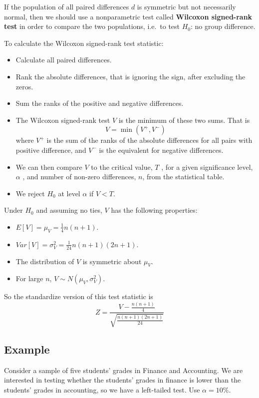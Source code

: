 \documentclass[
]{article}
\begin{document}
If the population of all paired differences \(d\) is symmetric but not
necessarily normal, then we should use a nonparametric test called
\textbf{Wilcoxon signed-rank test} in order to compare the two
populations, i.e.~to test \(H_0\): no group difference.

To calculate the Wilcoxon signed-rank test statistic:

\begin{itemize}
\item
  Calculate all paired differences.
\item
  Rank the absolute differences, that is ignoring the sign, after
  excluding the zeros.
\item
  Sum the ranks of the positive and negative differences.
\item
  The Wilcoxon signed-rank test \(V\) is the minimum of these two sums.
  That is \[V=\min(V^+,V^-)\] where \(V^+\) is the sum of the ranks of
  the absolute differences for all pairs with positive difference, and
  \(V^-\) is the equivalent for negative differences.
\item
  We can then compare \(V\) to the critical value, \(T\) , for a given
  significance level, \(\alpha\) , and number of non-zero differences,
  \(n\), from the statistical table.
\item
  We reject \(H_0\) at level \(\alpha\) if \(V<T\).
\end{itemize}

Under \(H_0\) and assuming no ties, \(V\) has the following properties:

\begin{itemize}
\item
  \(E[V] = \mu_{V} = \frac{1}{4}n(n+1)\).
\item
  \(Var[V] = \sigma^2_{V} = \frac{1}{24} n(n+1)(2n+1)\).
\item
  The distribution of \(V\) is symmetric about \(\mu_{V}\).
\item
  For large \(n\), \(V \sim N(\mu_{V}, \sigma^2_{V})\).
\end{itemize}

So the standardize version of this test statistic is
\[Z=\frac{V-\frac{n(n+1)}{4}}{\sqrt{\frac{n(n+1)(2n+1)}{24}}}\]

\hypertarget{example-5}{%
\subsection{Example}\label{example-5}}

Consider a sample of five students' grades in Finance and Accounting. We
are interested in testing whether the students' grades in finance is
lower than the students' grades in accounting, so we have a left-tailed
test. Use \(\alpha=10\%\).
\end{document}
